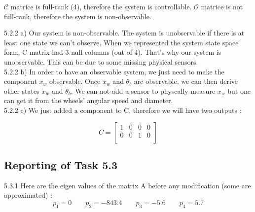 \documentclass[11pt]{article}
\begin{document}
$\mathcal{C}$ matrice is full-rank (4), therefore the system is controllable. 
$\mathcal{O}$ matrice is not full-rank, therefore the system is non-observable.


5.2.2 a) Our system is non-observable. The system is unobservable if there is at least one state we can’t observe. When we represented the system state space form, C matrix had 3 null columns (out of 4). That’s why our system is unobservable.
This can be due to some missing physical sensors.\\

5.2.2 b) In order to have an observable system, we just need to make the component $x_w$ observable. Once $x_w$ and $\theta_b$ are observable, we can then derive other states $\dot x_w$ and $\dot \theta_b$. We can not add a sensor to physcally measure $x_w$ but one can get it from the wheels' angular speed and diameter.\\

5.2.2 c) We just added a component to C, therefore we will have two outputs :

\begin{equation*}
C=
\begin{bmatrix}
1 & 0 & 0 & 0\\
0 & 0 & 1 & 0\\
\end{bmatrix}
\end{equation*}


\subsection*{Reporting of Task 5.3}

5.3.1 Here are the eigen values of the matrix A before any modification (some are approximated) :
\begin{equation*}
p_1=0 \qquad p_2=-843.4 \qquad p_3=-5.6 \qquad p_4=5.7
\end{equation*}
\end{document}
